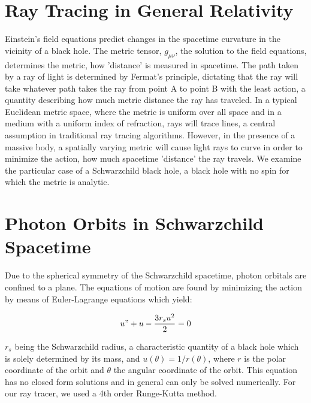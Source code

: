 \documentclass[sigconf]{acmart}
\begin{document}
%
\maketitle

\section{Ray Tracing in General Relativity}

Einstein's field equations predict changes in the spacetime curvature in the vicinity of a black hole. The metric tensor, $g_{\mu\nu}$, the solution to the field equations, determines the metric, how 'distance' is measured in spacetime. The path taken by a ray of light is determined by Fermat's principle, dictating that the ray will take whatever path takes the ray from point A to point B with the least action, a quantity describing how much metric distance the ray has traveled. In a typical Euclidean metric space, where the metric is uniform over all space and in a medium with a uniform index of refraction, rays will trace lines, a central assumption in traditional ray tracing algorithms. However, in the presence of a massive body, a spatially varying metric will cause light rays to curve in order to minimize the action, how much spacetime 'distance' the ray travels.  We examine the particular case of a Schwarzchild black hole, a black hole with no spin for which the metric is analytic.

\section{Photon Orbits in Schwarzchild Spacetime}

Due to the spherical symmetry of the Schwarzchild spacetime, photon orbitals are confined to a plane.  The equations of motion are found by minimizing the action by means of Euler-Lagrange equations which yield\cite{drakos_moore}:

\begin{displaymath}
  u" + u - \frac{3r_su^2}{2} = 0
\end{displaymath}

$r_s$ being the Schwarzchild radius, a characteristic quantity of a black hole which is solely determined by its mass, and $u(\theta) = 1/r(\theta)$, where $r$ is the polar coordinate of the orbit and $\theta$ the angular coordinate of the orbit.  This equation has no closed form solutions and in general can only be solved numerically.  For our ray tracer, we used a 4th order Runge-Kutta method.
\end{document}
